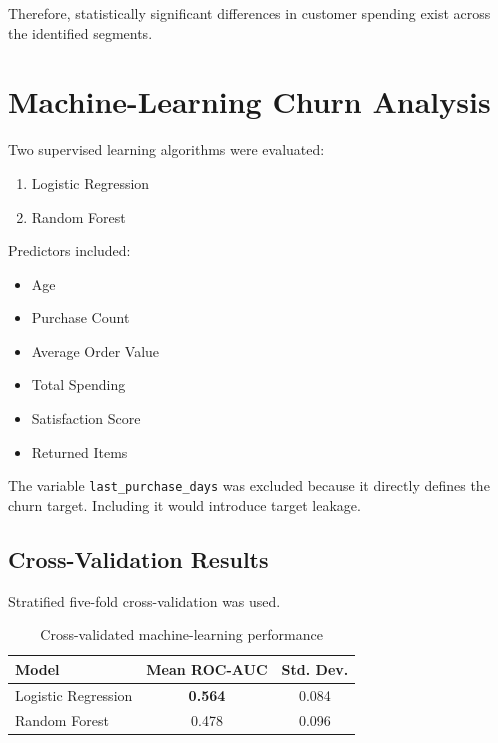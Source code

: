 \documentclass[11pt,a4paper]{article}
\begin{document}
Therefore, statistically significant differences in customer spending exist across the identified segments.


\section{Machine-Learning Churn Analysis}

Two supervised learning algorithms were evaluated:

\begin{enumerate}
    \item Logistic Regression
    \item Random Forest
\end{enumerate}

Predictors included:

\begin{itemize}
    \item Age
    \item Purchase Count
    \item Average Order Value
    \item Total Spending
    \item Satisfaction Score
    \item Returned Items
\end{itemize}

The variable \texttt{last\_purchase\_days} was excluded because it directly defines the churn target. Including it would introduce target leakage.

\subsection{Cross-Validation Results}

Stratified five-fold cross-validation was used.

\begin{table}[H]
\centering
\caption{Cross-validated machine-learning performance}
\label{tab:ml}
\begin{tabular}{lcc}
\toprule
\textbf{Model} & \textbf{Mean ROC-AUC} & \textbf{Std. Dev.}\\
\midrule
Logistic Regression & \textbf{0.564} & 0.084\\
Random Forest & 0.478 & 0.096\\
\bottomrule
\end{tabular}
\end{table}
\end{document}
